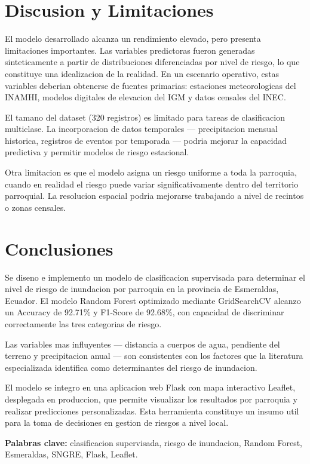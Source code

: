 \documentclass[12pt,a4paper]{article}
\begin{document}
\section{Discusion y Limitaciones}

El modelo desarrollado alcanza un rendimiento elevado, pero presenta limitaciones importantes. Las variables predictoras fueron generadas sinteticamente a partir de distribuciones diferenciadas por nivel de riesgo, lo que constituye una idealizacion de la realidad. En un escenario operativo, estas variables deberian obtenerse de fuentes primarias: estaciones meteorologicas del INAMHI, modelos digitales de elevacion del IGM y datos censales del INEC.

El tamano del dataset (320 registros) es limitado para tareas de clasificacion multiclase. La incorporacion de datos temporales --- precipitacion mensual historica, registros de eventos por temporada --- podria mejorar la capacidad predictiva y permitir modelos de riesgo estacional.

Otra limitacion es que el modelo asigna un riesgo uniforme a toda la parroquia, cuando en realidad el riesgo puede variar significativamente dentro del territorio parroquial. La resolucion espacial podria mejorarse trabajando a nivel de recintos o zonas censales.

\section{Conclusiones}

Se diseno e implemento un modelo de clasificacion supervisada para determinar el nivel de riesgo de inundacion por parroquia en la provincia de Esmeraldas, Ecuador. El modelo Random Forest optimizado mediante GridSearchCV alcanzo un Accuracy de 92.71\% y F1-Score de 92.68\%, con capacidad de discriminar correctamente las tres categorias de riesgo.

Las variables mas influyentes --- distancia a cuerpos de agua, pendiente del terreno y precipitacion anual --- son consistentes con los factores que la literatura especializada identifica como determinantes del riesgo de inundacion.

El modelo se integro en una aplicacion web Flask con mapa interactivo Leaflet, desplegada en produccion, que permite visualizar los resultados por parroquia y realizar predicciones personalizadas. Esta herramienta constituye un insumo util para la toma de decisiones en gestion de riesgos a nivel local.

\bigskip
\noindent\textbf{Palabras clave:} clasificacion supervisada, riesgo de inundacion, Random Forest, Esmeraldas, SNGRE, Flask, Leaflet.
\end{document}
